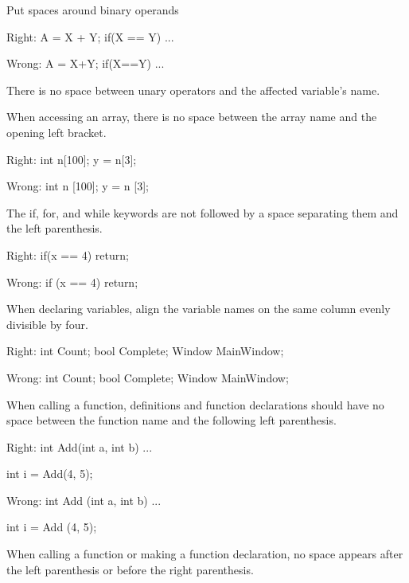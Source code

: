 \item
Put spaces around binary operands

Right:
\StartCodeExample
\starttyping
A = X + Y;
if(X == Y)
    ...
\stoptyping
\StopCodeExample

Wrong:
\StartCodeExample
\starttyping
A = X+Y;
if(X==Y)
    ...
\stoptyping
\StopCodeExample

\item
There is no space between unary operators and the affected variable's name.

\item
When accessing an array, there is no space between the array name and the opening left bracket. 

Right:
\StartCodeExample
\starttyping
int n[100];
y = n[3];
\stoptyping
\StopCodeExample

Wrong:
\StartCodeExample
\starttyping
int n [100];
y = n [3];
\stoptyping
\StopCodeExample

\item
The if, for, and while keywords are not followed by a space separating them and the left parenthesis. 

Right:
\StartCodeExample
\starttyping
if(x == 4)
    return;
\stoptyping
\StopCodeExample

Wrong:
\StartCodeExample
\starttyping
if (x == 4)
    return;
\stoptyping
\StopCodeExample

\item
When declaring variables, align the variable names on the same column evenly divisible by four.

Right:
\StartCodeExample
\starttyping
int     Count;
bool    Complete;
Window  MainWindow;
\stoptyping
\StopCodeExample

Wrong:
\StartCodeExample
\starttyping
int Count;
bool Complete;
Window MainWindow;
\stoptyping
\StopCodeExample

\item
When calling a function, definitions and function declarations should have no space between the function name and the following left parenthesis.

Right:
\StartCodeExample
\starttyping
int Add(int a, int b)
{ 
    ... 
}

int i = Add(4, 5);
\stoptyping
\StopCodeExample

Wrong:
\StartCodeExample
\starttyping
int Add (int a, int b)
{
    ...
}

int i = Add (4, 5);
\stoptyping
\StopCodeExample

\item
When calling a function or making a function declaration, no space appears after the left parenthesis or before the right parenthesis.

